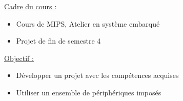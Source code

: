 \documentclass{beamer}
\begin{document}
\begin{frame}    
    \begin{center}
    \end{center}

    \hspace{0.5cm}\underline{Cadre du cours :}
    \normalsize
    \vspace{0.5cm}
    \begin{itemize}[label=\textbullet, leftmargin=1.5cm]
        \item Cours de MIPS, Atelier en système embarqué
        \item Projet de fin de semestre 4
    \end{itemize}

    \vspace{0.6cm}
    \hspace{0.5cm}\underline{Objectif :}
    \normalsize
    \vspace{0.5cm}
    \begin{itemize}[label=\textbullet, leftmargin=1.5cm]
        \item Développer un projet avec les compétences acquises 
        \item Utiliser un ensemble de périphériques imposés
    \end{itemize}


\end{frame}

\end{document}

